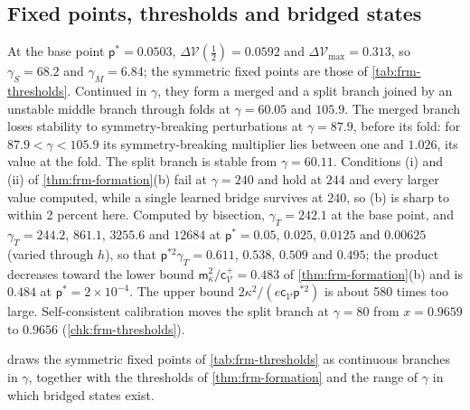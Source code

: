 \subsection{Fixed points, thresholds and bridged states}\label{sup:frm-fixed-points-thresholds-and-bridged-stat}

\begin{observation}\label{obs:frm-thresholds}
At the base point $\mathsf p^\ast=0.0503$, $\Delta\mathcal V(\frac12)=0.0592$ and $\Delta\mathcal V_{\max}=0.313$, so $\gamma_S=68.2$ and $\gamma_M=6.84$; the symmetric fixed points are those of \cref{tab:frm-thresholds}. Continued in $\gamma$, they form a merged and a split branch joined by an unstable middle branch through folds at $\gamma=60.05$ and $105.9$. The merged branch loses stability to symmetry-breaking perturbations at $\gamma=87.9$, before its fold: for $87.9<\gamma<105.9$ its symmetry-breaking multiplier lies between one and $1.026$, its value at the fold. The split branch is stable from $\gamma=60.11$. Conditions (i) and (ii) of \cref{thm:frm-formation}(b) fail at $\gamma=240$ and hold at $244$ and every larger value computed, while a single learned bridge survives at $240$, so (b) is sharp to within 2 percent here. Computed by bisection, $\gamma_T=242.1$ at the base point, and $\gamma_T=244.2$, $861.1$, $3255.6$ and $12684$ at $\mathsf p^\ast=0.05$, $0.025$, $0.0125$ and $0.00625$ (varied through $h$), so that $\mathsf p^{\ast2}\gamma_T=0.611$, $0.538$, $0.509$ and $0.495$; the product decreases toward the lower bound $\mathsf m_\kappa^2/\mathsf c^+_{\mathcal V}=0.483$ of \cref{thm:frm-formation}(b) and is $0.484$ at $\mathsf p^\ast=2\times10^{-4}$. The upper bound $2\kappa^2/(e\mathsf c_{\mathcal V}\mathsf p^{\ast2})$ is about 580 times too large. Self-consistent calibration moves the split branch at $\gamma=80$ from $x=0.9659$ to $0.9656$ (\cref{chk:frm-thresholds}).
\end{observation}

 draws the symmetric fixed points of \cref{tab:frm-thresholds} as continuous branches in $\gamma$, together with the thresholds of \cref{thm:frm-formation} and the range of $\gamma$ in which bridged states exist.

